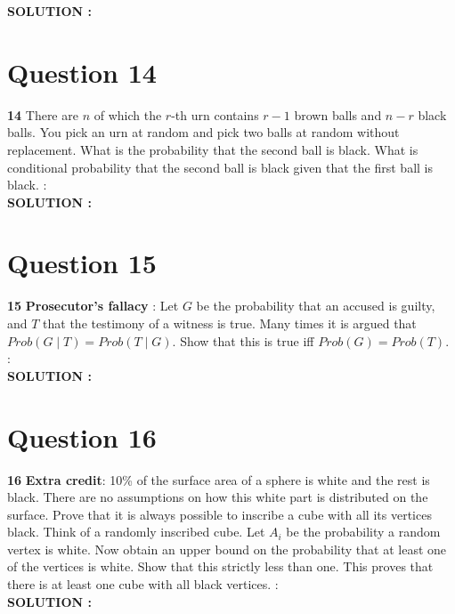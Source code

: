 \documentclass{article}
\begin{document}
\hspace{1em} \large{\textbf{SOLUTION :}} \\

\section{Question 14}
\label{Q14}
\textbf{14} There are $n$ of which the $r$-th urn contains $r - 1$ brown balls and $n - r$ black balls. You pick an urn at random and pick two balls at random without replacement. What is the probability that the second ball is black. What is conditional probability that the second ball is black given that the first ball is black.  : \\


\hspace{1em} \large{\textbf{SOLUTION :}} \\

\section{Question 15}
\label{Q15}
\textbf{15} \textbf{Prosecutor’s fallacy} : Let $G$ be the probability that an accused is guilty, and $T$ that the testimony of a witness is true. Many times it is argued that $Prob (G \mid T) = Prob (T \mid G)$. Show that this is true iff $Prob (G) = Prob (T).$ : \\ 


\hspace{1em} \large{\textbf{SOLUTION :}} \\

\section{Question 16}
\label{Q16}
\textbf{16} \textbf{Extra credit}: 10\% of the surface area of a sphere is white and the rest is black. There are no assumptions on how this white part is distributed on the surface. Prove that it is always possible to inscribe a cube with all its vertices black. Think of a randomly inscribed cube. Let $A_i$ be the probability a random vertex is white. Now obtain an upper bound on the probability that at least one of the vertices is white. Show that this strictly less than one. This proves that there is at least one cube with all black vertices.
 : \\

\hspace{1em} \large{\textbf{SOLUTION :}} \\
\end{document}
